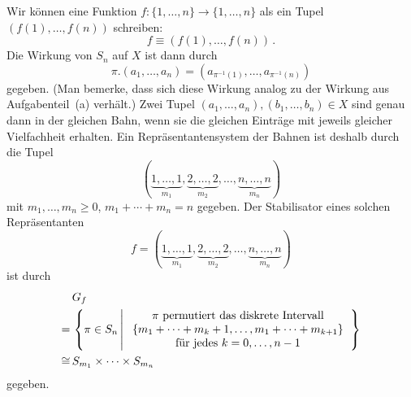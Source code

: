 Wir können eine Funktion $f \colon \{1, \dotsc, n\} \to \{1, \dotsc, n\}$ als ein Tupel $(f(1), \dotsc, f(n))$ schreiben:
\[
          f
  \equiv  (f(1), \dotsc, f(n))\,.
\]
Die Wirkung von $S_n$ auf $X$ ist dann durch
\[
    \pi.(a_1, \dotsc, a_n)
  = \left( a_{\pi^{-1}(1)}, \dotsc, a_{\pi^{-1}(n)} \right)
\]
gegeben.
(Man bemerke, dass sich diese Wirkung analog zu der Wirkung aus Aufgabenteil~(a) verhält.)
Zwei Tupel $(a_1, \dotsc, a_n), (b_1, \dotsc, b_n) \in X$ sind genau dann in der gleichen Bahn, wenn sie die gleichen Einträge mit jeweils gleicher Vielfachheit erhalten.
Ein Repräsentantensystem der Bahnen ist deshalb durch die Tupel
\[
  ( \underbrace{1, \dotsc, 1}_{m_1},
    \underbrace{2, \dotsc, 2}_{m_2},
    \dotsc,
    \underbrace{n, \dotsc, n}_{m_n} )
\]
mit $m_1, \dotsc, m_n \geq 0$, $m_1 + \dotsb + m_n = n$ gegeben.
Der Stabilisator eines solchen Repräsentanten
\[
  f = ( \underbrace{1, \dotsc, 1}_{m_1},
        \underbrace{2, \dotsc, 2}_{m_2},
        \dotsc,
        \underbrace{n, \dotsc, n}_{m_n} )
\]
ist durch
\begin{align*}
   &\,      G_f
  \\
  =&\,      \left\{
              \pi \in S_n
            \suchthat*
              \begin{tabular}{c}
                $\pi$ permutiert das diskrete Intervall \\
                $\{m_1 + \dotsb + m_k + 1, \dotsc, m_1 + \dotsb + m_{k+1}\}$  \\
                für jedes $k = 0, \dotsc, n-1$
              \end{tabular}
            \right\}
  \\
  \cong&\,  S_{m_1} \times \dotsb \times S_{m_n}
\end{align*}
gegeben.





